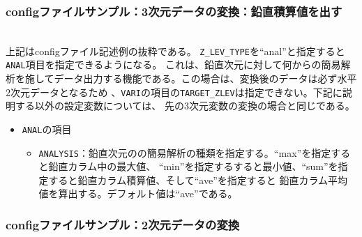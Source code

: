 \subsubsection{configファイルサンプル：3次元データの変換：鉛直積算値を出す}

\\

\noindent 上記はconfigファイル記述例の抜粋である。
\verb|Z_LEV_TYPE|を``anal''と指定すると
\verb|ANAL|項目を指定できるようになる。
これは、鉛直次元に対して何からの簡易解析を施してデータ出力する機能である。この場合は、変換後のデータは必ず水平2次元データとなるため
、\verb|VARI|の項目の\verb|TARGET_ZLEV|は指定できない。下記に説明する以外の設定変数については、
先の3次元変数の変換の場合と同じである。
\begin{itemize}
 \item \verb|ANAL|の項目
 \begin{itemize}
  \item \verb|ANALYSIS|：鉛直次元のの簡易解析の種類を指定する。``max''を指定すると鉛直カラム中の最大値、
        ``min''を指定するすると最小値、``sum''を指定すると鉛直カラム積算値、そして``ave''を指定すると
        鉛直カラム平均値を算出する。デフォルト値は``ave''である。
 \end{itemize}
\end{itemize}


\subsubsection{configファイルサンプル：2次元データの変換}

